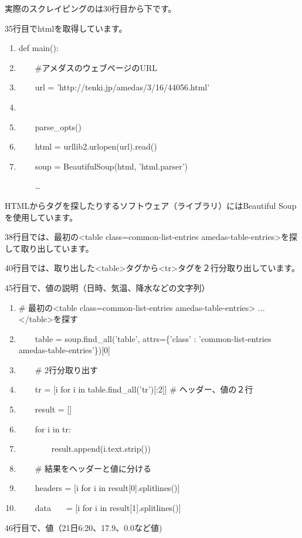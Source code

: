 \documentclass[a4paper,12pt,dvipdfmx]{jarticle}
\begin{document}
\bigskip

\clearpage
実際のスクレイピングのは30行目から下です。

35行目でhtmlを取得しています。

\begin{center}
\begin{boxedminipage}{16.947cm}
\begin{enumerate}
\setlength{\itemsep}{0cm} %
\setcounter{enumi}{29}
\item def main():
\item \ \ \ \ \#アメダスのウェブページのURL
\item \ \ \ \ url = 'http://tenki.jp/amedas/3/16/44056.html'
\item
\item \ \ \ \ parse\_opts()
\item \ \ \ \ html = urllib2.urlopen(url).read()
\item \ \ \ \ soup = BeautifulSoup(html, 'html.parser')

\ \ \ \ …
\end{enumerate}
\end{boxedminipage}
\end{center}
HTMLからタグを探したりするソフトウェア（ライブラリ）にはBeautiful
Soupを使用しています。

38行目では、最初の{\textless}table class={\textquotedbl}common-list-entries
amedas-table-entries{\textquotedbl}{\textgreater}を探して取り出しています。

40行目では、取り出した{\textless}table{\textgreater}タグから{\textless}tr{\textgreater}タグを２行分取り出しています。

45行目で、値の説明（日時、気温、降水などの文字列）

\begin{center}
\begin{boxedminipage}{17.658cm}
\begin{enumerate}
\setlength{\itemsep}{0cm} %
\baselineskip 10pt
\setcounter{enumi}{36}
\item \# 最初の{\textless}table class={\textquotedbl}common-list-entries
amedas-table-entries{\textquotedbl}{\textgreater} ... {\textless}/table{\textgreater}を探す
\item \ \ \ \ table = soup.find\_all('table', attrs=\{'class' : 'common-list-entries amedas-table-entries'\})[0]
\item \ \ \ \ \# 2行分取り出す
\item \ \ \ \ tr = [i for i in table.find\_all('tr')[:2]] \#
ヘッダー、値の２行
\item \ \ \ \ result = []
\item \ \ \ \ for i in tr:
\item \ \ \ \ \ \ \ \ result.append(i.text.strip())
\item \ \ \ \ \# 結果をヘッダーと値に分ける
\item \ \ \ \ headers = [i for i in result[0].splitlines()]
\item \ \ \ \ data \ \ \ = [i for i in result[1].splitlines()]
\end{enumerate}
\end{boxedminipage}
\end{center}
46行目で、値（21日6:20、17.9、0.0など値)
\end{document}
